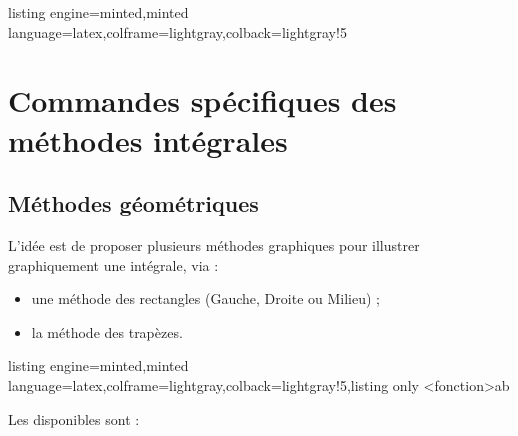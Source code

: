 \documentclass[11pt,a4paper]{ltxdoc}
\begin{document}
\begin{tcblisting}{listing engine=minted,minted language=latex,colframe=lightgray,colback=lightgray!5}
\begin{GraphiqueTikz}[x=0.5cm,y=100cm,Origx=14.5,Xmin=14.5,Xmax=35.5,
	Xgrille=5,Xgrilles=1,Ymin=0,Ymax=0.09,Ygrille=0.01,Ygrilles=0.001]
\end{GraphiqueTikz}
\end{tcblisting}

\pagebreak

\section{Commandes spécifiques des méthodes intégrales}

\subsection{Méthodes géométriques}\label{methodesintergrales}

L'idée est de proposer plusieurs méthodes graphiques pour illustrer graphiquement une intégrale, via :

\begin{itemize}
	\item une méthode des rectangles (Gauche, Droite ou Milieu) ;
	\item la méthode des trapèzes.
\end{itemize}

\begin{tcblisting}{listing engine=minted,minted language=latex,colframe=lightgray,colback=lightgray!5,listing only}
\RepresenterMethodeIntegrale[clés]<fonction>{a}{b}
\end{tcblisting}

Les  disponibles sont :
\end{document}
